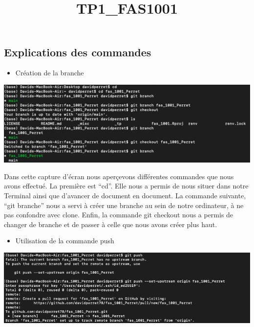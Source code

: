 \documentclass[
  letterpaper,
  DIV=11,
  numbers=noendperiod]{scrartcl}
\title{TP1\_FAS1001}
\author{}
\date{}
\providecommand{\tightlist}{%
  \setlength{\itemsep}{0pt}\setlength{\parskip}{0pt}}\usepackage{longtable,booktabs,array}
\begin{document}
\maketitle
\ifdefined\Shaded\renewenvironment{Shaded}{\begin{tcolorbox}[frame hidden, borderline west={3pt}{0pt}{shadecolor}, boxrule=0pt, interior hidden, sharp corners, enhanced, breakable]}{\end{tcolorbox}}\fi

\hypertarget{explications-des-commandes}{%
\subsection{Explications des
commandes}\label{explications-des-commandes}}

\begin{itemize}
\tightlist
\item
  Création de la branche
\end{itemize}

\includegraphics[width=9.63542in,height=\textheight]{images/screen git branch.png}

Dans cette capture d'écran nous aperçevons différentes commandes que
nous avons effectué. La première est ``cd''. Elle nous a permis de nous
situer dans notre Terminal ainsi que d'avancer de document en document.
La commande suivante, ``git branche'' nous a servi à créer une branche
au sein de notre ordinateur, à ne pas confondre avec clone. Enfin, la
commande git checkout nous a permis de changer de branche et de passer à
celle que nous avons créer plus haut.

\begin{itemize}
\tightlist
\item
  Utilisation de la commande push
\end{itemize}

\includegraphics{images/screen git push.png}
\end{document}

